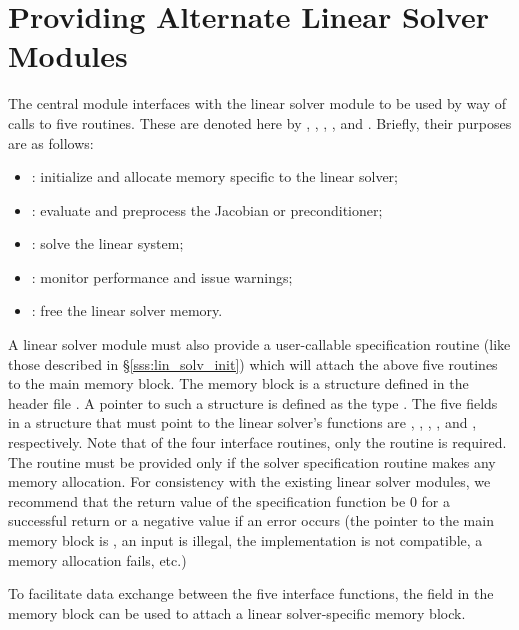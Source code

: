 \chapter{Providing Alternate Linear Solver Modules}\label{s:new_linsolv}
The central {\ida} module interfaces with the linear solver module to be
used by way of calls to five routines.  These are denoted here by 
, , , , and .
Briefly, their purposes are as follows:
\begin{itemize}
\item {}: initialize and allocate memory specific to the
  linear solver;
\item {}: evaluate and preprocess the Jacobian or preconditioner;
\item {}: solve the linear system;
\item {}: monitor performance and issue warnings;
\item {}: free the linear solver memory.
\end{itemize}
A linear solver module must also provide a user-callable specification routine
(like those described in \S\ref{sss:lin_solv_init}) which will attach
the above five routines to the main {\ida} memory block. 
The {\ida} memory block is a structure defined in the header file . 
A pointer to such a structure is defined as the type . 
The five fields in a  structure that must point to the linear solver's 
functions are , , , , 
and , respectively.
Note that of the four interface routines, only the  routine is required. 
The  routine must be provided only if the solver specification routine
makes any memory allocation.
For consistency with the existing {\ida} linear solver modules, we recommend that the 
return value of the specification function be 0 for a successful return or a negative value 
if an error occurs (the pointer to the main {\ida} memory block is , 
an input is illegal, the {\nvector} implementation is not compatible, a memory allocation 
fails, etc.)

To facilitate data exchange between the five interface functions, the field 
in the {\ida} memory block can be used to attach a linear solver-specific memory
block.

